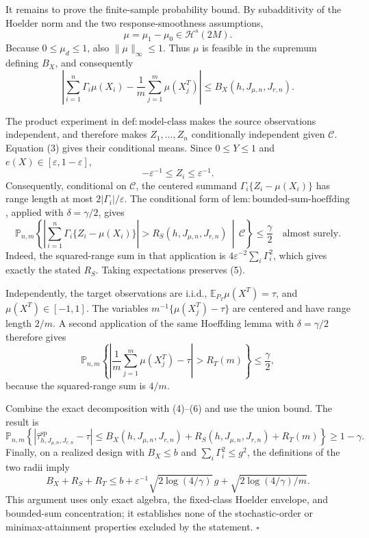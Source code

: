 It remains to prove the finite-sample probability bound.  By subadditivity of the Hoelder norm and the two response-smoothness assumptions,
\[
\mu=\mu_1-\mu_0\in\mathcal H^s(2M).
\]
Because \(0\le\mu_d\le1\), also \(\|\mu\|_\infty\le1\).  Thus \(\mu\) is feasible in the supremum defining \(B_X\), and consequently
\[
\left|\sum_{i=1}^n\Gamma_i\mu(X_i)-\frac1m\sum_{j=1}^m\mu(X_j^T)\right|
\le B_X(h,J_{\mu,n},J_{r,n}).
\tag{4}
\]

The product experiment in \(\mathrm{def:model\text{-}class}\) makes the source observations independent, and therefore makes \(Z_1,\ldots,Z_n\) conditionally independent given \(\mathcal C\).  Equation (3) gives their conditional means.  Since \(0\le Y\le1\) and \(e(X)\in[\varepsilon,1-\varepsilon]\),
\[
-\varepsilon^{-1}\le Z_i\le\varepsilon^{-1}.
\]
Consequently, conditional on \(\mathcal C\), the centered summand \(\Gamma_i\{Z_i-\mu(X_i)\}\) has range length at most \(2|\Gamma_i|/\varepsilon\).  The conditional form of \(\mathrm{lem:bounded\text{-}sum\text{-}hoeffding}\), applied with \(\delta=\gamma/2\), gives
\[
\mathbb P_{n,m}\!\left\{
\left|\sum_{i=1}^n\Gamma_i\{Z_i-\mu(X_i)\}\right|>R_S(h,J_{\mu,n},J_{r,n})
\,\middle|\,\mathcal C\right\}\le\frac\gamma2
\quad\text{almost surely}.
\tag{5}
\]
Indeed, the squared-range sum in that application is \(4\varepsilon^{-2}\sum_i\Gamma_i^2\), which gives exactly the stated \(R_S\).  Taking expectations preserves (5).

Independently, the target observations are i.i.d., \(\mathbb E_{P_T}\mu(X^T)=\tau\), and \(\mu(X^T)\in[-1,1]\).  The variables \(m^{-1}\{\mu(X_j^T)-\tau\}\) are centered and have range length \(2/m\).  A second application of the same Hoeffding lemma with \(\delta=\gamma/2\) therefore gives
\[
\mathbb P_{n,m}\!\left\{
\left|\frac1m\sum_{j=1}^m\mu(X_j^T)-\tau\right|>R_T(m)
\right\}\le\frac\gamma2,
\tag{6}
\]
because the squared-range sum is \(4/m\).

Combine the exact decomposition with (4)--(6) and use the union bound.  The result is
\[
\mathbb P_{n,m}\!\left\{
\left|\widehat\tau^{\mathrm{sp}}_{h,J_{\mu,n},J_{r,n}}-\tau\right|
\le B_X(h,J_{\mu,n},J_{r,n})+R_S(h,J_{\mu,n},J_{r,n})+R_T(m)
\right\}\ge1-\gamma.
\]
Finally, on a realized design with \(B_X\le b\) and \(\sum_i\Gamma_i^2\le g^2\), the definitions of the two radii imply
\[
B_X+R_S+R_T
\le b+\varepsilon^{-1}\sqrt{2\log(4/\gamma)}\,g
+\sqrt{2\log(4/\gamma)/m}.
\]
This argument uses only exact algebra, the fixed-class Hoelder envelope, and bounded-sum concentration; it establishes none of the stochastic-order or minimax-attainment properties excluded by the statement. \(\square\)